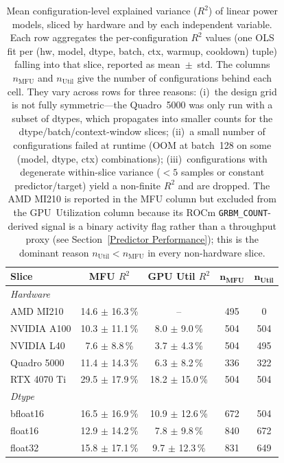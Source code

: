 \begin{table}[t]
\centering
\caption{Mean configuration-level explained variance ($R^2$) of linear power models, sliced by hardware and by each independent variable. Each row aggregates the per-configuration $R^2$ values (one OLS fit per (hw, model, dtype, batch, ctx, warmup, cooldown) tuple) falling into that slice, reported as mean~$\pm$~std. The columns $n_\text{MFU}$ and $n_\text{Util}$ give the number of configurations behind each cell. They vary across rows for three reasons: (i)~the design grid is not fully symmetric---the Quadro~5000 was only run with a subset of dtypes, which propagates into smaller counts for the dtype/batch/context-window slices; (ii)~a small number of configurations failed at runtime (OOM at batch~128 on some (model, dtype, ctx) combinations); (iii)~configurations with degenerate within-slice variance ($<\!5$ samples or constant predictor/target) yield a non-finite $R^2$ and are dropped. The AMD MI210 is reported in the MFU column but excluded from the GPU~Utilization column because its ROCm \texttt{GRBM\_COUNT}-derived signal is a binary activity flag rather than a throughput proxy (see Section~\ref{Predictor Performance}); this is the dominant reason $n_\text{Util}\!<\!n_\text{MFU}$ in every non-hardware slice.}
\small
\setlength{\tabcolsep}{4pt}
\renewcommand{\arraystretch}{1.15}
\begin{tabular}{lcccc}
\toprule
\textbf{Slice} & \textbf{MFU $R^2$} & \textbf{GPU Util $R^2$} & $\boldsymbol{n_\text{MFU}}$ & $\boldsymbol{n_\text{Util}}$ \\
\midrule
\multicolumn{5}{l}{\textit{Hardware}} \\
\quad AMD MI210 & 14.6 $\pm$ 16.3\,\% & -- & 495 & 0 \\
\quad NVIDIA A100 & 10.3 $\pm$ 11.1\,\% & 8.0 $\pm$ 9.0\,\% & 504 & 504 \\
\quad NVIDIA L40 & 7.6 $\pm$ 8.8\,\% & 3.7 $\pm$ 4.3\,\% & 504 & 495 \\
\quad Quadro 5000 & 11.4 $\pm$ 14.3\,\% & 6.3 $\pm$ 8.2\,\% & 336 & 322 \\
\quad RTX 4070 Ti & 29.5 $\pm$ 17.9\,\% & 18.2 $\pm$ 15.0\,\% & 504 & 504 \\
\midrule
\multicolumn{5}{l}{\textit{Dtype}} \\
\quad bfloat16 & 16.5 $\pm$ 16.9\,\% & 10.9 $\pm$ 12.6\,\% & 672 & 504 \\
\quad float16 & 12.9 $\pm$ 14.2\,\% & 7.8 $\pm$ 9.8\,\% & 840 & 672 \\
\quad float32 & 15.8 $\pm$ 17.1\,\% & 9.7 $\pm$ 12.3\,\% & 831 & 649 \\

\end{tabular}
\end{table}
